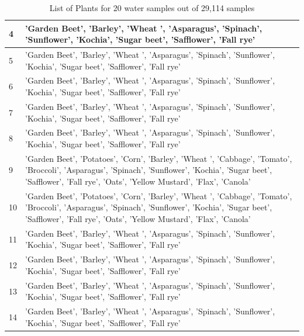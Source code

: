 \begin{table}[H]
\begin{tabular}{|m{}|m{}|}
        4 & 'Garden Beet', 'Barley', 'Wheat ', 'Asparagus', 'Spinach', 'Sunflower', 'Kochia', 'Sugar beet', 'Safflower', 'Fall rye' \\ \hline
        5 & 'Garden Beet', 'Barley', 'Wheat ', 'Asparagus', 'Spinach', 'Sunflower', 'Kochia', 'Sugar beet', 'Safflower', 'Fall rye' \\ \hline
        6 & 'Garden Beet', 'Barley', 'Wheat ', 'Asparagus', 'Spinach', 'Sunflower', 'Kochia', 'Sugar beet', 'Safflower', 'Fall rye' \\ \hline
        7 & 'Garden Beet', 'Barley', 'Wheat ', 'Asparagus', 'Spinach', 'Sunflower', 'Kochia', 'Sugar beet', 'Safflower', 'Fall rye' \\ \hline
        8 & 'Garden Beet', 'Barley', 'Wheat ', 'Asparagus', 'Spinach', 'Sunflower', 'Kochia', 'Sugar beet', 'Safflower', 'Fall rye' \\ \hline
        9 & 'Garden Beet', 'Potatoes', 'Corn', 'Barley', 'Wheat ', 'Cabbage', 'Tomato', 'Broccoli', 'Asparagus', 'Spinach', 'Sunflower', 'Kochia', 'Sugar beet', 'Safflower', 'Fall rye', 'Oats', 'Yellow Mustard', 'Flax', 'Canola' \\ \hline
        10 & 'Garden Beet', 'Potatoes', 'Corn', 'Barley', 'Wheat ', 'Cabbage', 'Tomato', 'Broccoli', 'Asparagus', 'Spinach', 'Sunflower', 'Kochia', 'Sugar beet', 'Safflower', 'Fall rye', 'Oats', 'Yellow Mustard', 'Flax', 'Canola' \\ \hline
        11 & 'Garden Beet', 'Barley', 'Wheat ', 'Asparagus', 'Spinach', 'Sunflower', 'Kochia', 'Sugar beet', 'Safflower', 'Fall rye' \\ \hline
        12 & 'Garden Beet', 'Barley', 'Wheat ', 'Asparagus', 'Spinach', 'Sunflower', 'Kochia', 'Sugar beet', 'Safflower', 'Fall rye' \\ \hline
        13 & 'Garden Beet', 'Barley', 'Wheat ', 'Asparagus', 'Spinach', 'Sunflower', 'Kochia', 'Sugar beet', 'Safflower', 'Fall rye' \\ \hline
        14 & 'Garden Beet', 'Barley', 'Wheat ', 'Asparagus', 'Spinach', 'Sunflower', 'Kochia', 'Sugar beet', 'Safflower', 'Fall rye' \\ \hline
    \end{tabular}
    \caption{List of Plants for 20 water samples out of 29,114 samples}
    \label{table:waterPlantsResult}
\end{table}

